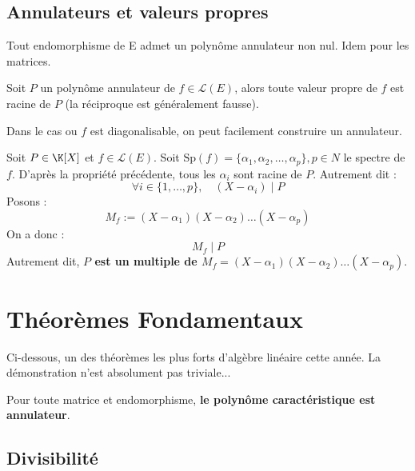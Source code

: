 \subsection{Annulateurs et valeurs propres}

\begin{proposition}
    Tout endomorphisme de E admet un polynôme annulateur non nul. 
    Idem pour les matrices. 
\end{proposition}

\begin{prop}
    Soit $P$ un polynôme annulateur de $f \in \mathcal{L}(E)$, alors toute valeur propre de $f$ est racine de $P$
    (la réciproque est généralement fausse). 
\end{prop}

\begin{remark}
    Dans le cas ou $f$ est diagonalisable, on peut facilement construire un annulateur. 
    
    Soit $P \in \K[X]$ et $f \in \mathcal{L}(E)$. Soit $\text{Sp}(f) = \{\alpha_1, \alpha_2, \dots, \alpha_p\}, p \in N$ 
    le spectre de $f$. D'après la propriété précédente, tous les $\alpha_i$ sont racine de $P$. 
    Autrement dit : 
        \[ \forall i \in \{1,\dots,p\}, \quad (X - \alpha_i) \; | \; P \]
    Posons :
        \[ M_f := (X - \alpha_1)(X - \alpha_2) \dots (X - \alpha_p)\]
    On a donc : 
        \[ M_f \; | \; P\]
    Autrement dit, \textbf{$P$ est un multiple de $M_f = (X - \alpha_1)(X - \alpha_2) \dots (X - \alpha_p)$}.
\end{remark}



\section{Théorèmes Fondamentaux}

Ci-dessous, un des théorèmes les plus forts d'algèbre linéaire cette année. 
La démonstration n'est absolument pas triviale...

\begin{theorem}
    Pour toute matrice et endomorphisme, \textbf{le polynôme caractéristique est annulateur}. 
\end{theorem}

\subsection{Divisibilité}

